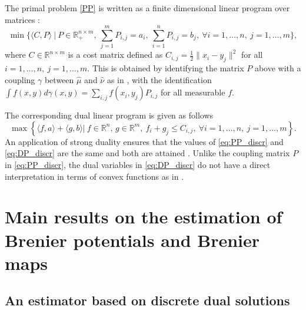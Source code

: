 \documentclass[11pt]{article}
\newcommand{\R}{\mathbb R}
\newcommand{\1}{\mathbbm{1}}
\numberwithin{equation}{section}
\begin{document}
The primal problem \eqref{PP} is written as a finite dimensional linear program over matrices \cite[Section 2.3]{peyre2019computational}:
\begin{equation}
    \min\Big\{
        \langle C,P \rangle\:\Big|\:
        P\in \R_+^{n\times m},\:
        \sum_{j=1}^mP_{i,j}=a_i,\:
        \sum_{i=1}^nP_{i,j}=b_j,\:
        \forall i=1,\ldots,n,\:j=1,\ldots,m
    \Big\},
    \label{eq:PP_discr}
    \tag{PP-discr}
\end{equation}
where $C\in\R^{n\times m}$ is a cost matrix defined as $C_{i,j}=\frac{1}{2}\|x_i-y_j\|^2$ for all $i=1,\ldots,n,\:j=1,\ldots,m$. This is obtained by identifying the matrix $P$ above with a coupling $\gamma$ between $\hat\mu$ and $\hat\nu$ as in , with the identification $\int f(x,y) d\gamma(x,y) = \sum_{i,j} f(x_i,y_j) P_{i,j}$ for all measurable $f$.

The corresponding dual linear program is given as follows \cite[Section 2.5]{peyre2019computational}
\begin{equation}
    \max\left\{ 
        \langle f,a \rangle+\langle g,b \rangle \Big|\:
        f\in\R^n,\, g \in\R^{m},\:
        f_i+g_j\leq C_{i,j},\:
        \forall i=1,\ldots,n,\:j=1,\ldots,m
    \right\}.
    \label{eq:DP_discr}
    \tag{DP-discr}
\end{equation}
An application of strong duality ensures that the values of \eqref{eq:PP_discr} and \eqref{eq:DP_discr} are the same and both are attained \cite[Proposition 2.4]{peyre2019computational}. Unlike the coupling matrix $P$ in \eqref{eq:PP_discr}, the dual variables in \eqref{eq:DP_discr} do not have a direct interpretation in terms of convex functions as in .
\section{Main results on the estimation of Brenier potentials and Brenier maps}

\subsection{An estimator based on discrete dual solutions}
\label{sec:estimator}
\end{document}
